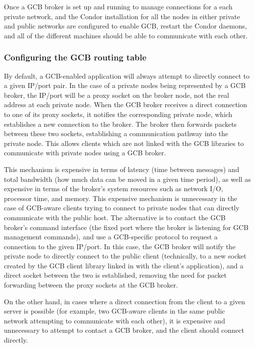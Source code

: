 Once a GCB broker is set up and running to manage connections for a
each private network, and the Condor installation for all the nodes in
either private and public networks are configured to enable GCB,
restart the Condor daemons, and all of the different machines
should be able to communicate with each other.


\subsubsection{\label{sec:GCB-routing-table}Configuring the GCB
  routing table} 

By default, a GCB-enabled application will always attempt to directly
connect to a given IP/port pair.
In the case of a private nodes being represented by a GCB broker, the
IP/port will be a proxy socket on the broker node, not the real
address at each private node.
When the GCB broker receives a direct connection to one of its proxy 
sockets, it notifies the corresponding private node, which
establishes a new connection to the broker.
The broker then forwards packets between these two sockets,
establishing a communication pathway into the private node.
This allows clients which are not linked with the GCB libraries to communicate
with private nodes using a GCB broker.

This mechanism is expensive
in terms of latency (time between messages) and total bandwidth
(how much data can be moved in a given time period),
as well as expensive in terms of the broker's
system resources such as network I/O, processor time, and memory.
This expensive mechanism is 
unnecessary in the case of
GCB-aware clients trying to connect to private nodes that can directly
communicate with the public host.
The alternative is to contact the GCB broker's command interface (the
fixed port where the broker is listening for GCB management commands),
and use
a GCB-specific protocol to request a connection to the given IP/port.
In this case, the GCB broker will notify the private node to directly
connect to the public client (technically, to a new socket created by
the GCB client library linked in with the client's application), and a
direct socket between the two is established, removing the need for
packet forwarding between the proxy sockets at the GCB broker.

On the other hand, in cases where a direct connection from the client
to a given server is possible
(for example, two GCB-aware clients in the same
public network attempting to communicate with each other),
it is
expensive and unnecessary to attempt to contact a GCB broker, and the
client should connect directly.

